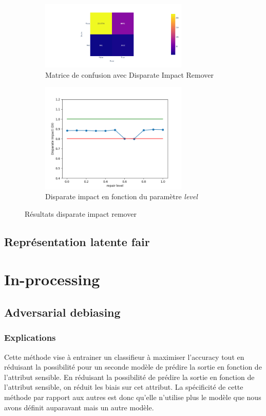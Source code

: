 \documentclass{article}
\begin{document}
    \begin{figure}[!h]
        \vspace{2cm}
        \centering
        \begin{subfigure}{7cm}
            \includegraphics[width=7cm]{./img/DIR_confusion_matrix.png}
            \caption{Matrice de confusion avec Disparate Impact Remover}\label{fig:DIR_matrix}
        \end{subfigure}
        \hspace{0.2cm}
        \begin{subfigure}{7cm}
            \includegraphics[width=7cm]{./img/disparate_impact_remover.png}
        \caption{Disparate impact en fonction du paramètre \textit{level}}\label{fig:DIR_param}
        \end{subfigure}
        \caption{Résultats disparate impact remover}\label{fig:DIR}
    \end{figure}


    \subsection{Représentation latente fair}
    

    \section{In-processing}

    \subsection{Adversarial debiasing}
    \subsubsection{Explications}
    Cette méthode vise à entrainer un classifieur à maximiser l'accuracy tout en réduisant la possibilité pour un seconde 
    modèle de prédire la sortie en fonction de l'attribut sensible. En réduisant la possibilité de prédire la sortie en 
    fonction de l'attribut sensible, on réduit les biais sur cet attribut.
    La spécificité de cette méthode par rapport aux autres est donc qu'elle n'utilise plus le modèle que nous avons 
    définit auparavant mais un autre modèle.
\end{document}
